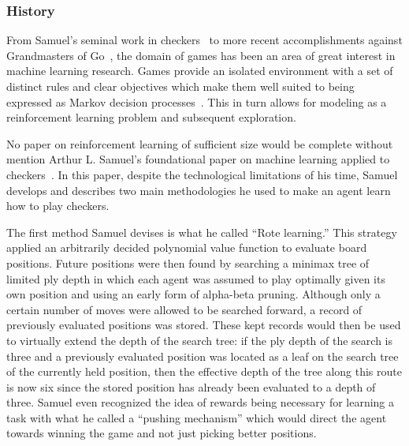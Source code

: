 

\subsubsection*{History}

From Samuel's seminal work in checkers~\cite{samuel_checkers}
to more recent accomplishments against Grandmasters of
Go~\cite{deepmind_alphago},
the domain of games has been an area of great interest in machine learning
research.
%
Games provide an isolated environment with a set of distinct rules and clear
objectives which make them well suited to being expressed as Markov decision
processes~\cite{samuel_checkers}.
%
This in turn allows for modeling as a reinforcement learning problem and
subsequent exploration.



No paper on reinforcement learning of sufficient size would be complete without
mention Arthur L. Samuel's foundational paper on machine learning applied to
checkers~\cite{samuel_checkers}.
%
In this paper,
despite the technological limitations of his time,
Samuel develops and describes two main methodologies he used to make an agent
learn how to play checkers.

The first method Samuel devises is what he called ``Rote learning.''
%
This strategy applied an arbitrarily decided polynomial value function
to evaluate board positions.
%
Future positions were then found by searching a minimax tree
of limited ply depth
in which each agent was assumed to play optimally given its own position
and using an early form of alpha-beta pruning.
%
Although only a certain number of moves were allowed to be searched forward,
a record of previously evaluated positions was stored.
%
These kept records would then be used to virtually extend the depth of the
search tree:
if the ply depth of the search is three and a previously evaluated position was
located as a leaf on the search tree of the currently held position,
then the effective depth of the tree along this route is now six since the
stored position has already been evaluated to a depth of three.
%
Samuel even recognized the idea of rewards being necessary for learning a task
with what he called a ``pushing mechanism'' which would direct the agent towards
winning the game and not just picking better positions.

